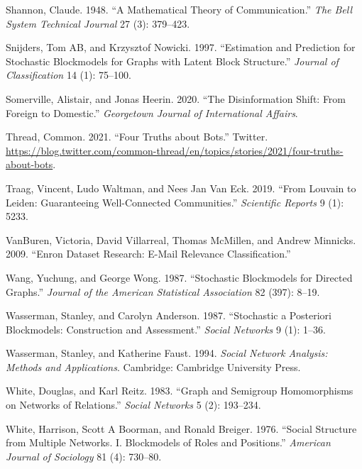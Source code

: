 \documentclass[
  12pt,
  a4paper,
  DIV=11,
  numbers=noendperiod,
  twoside,
  open=any]{scrartcl}
\newlength{\cslhangindent}
\newenvironment{CSLReferences}[2] %
 {\begin{list}{}{%
  \setlength{\itemindent}{0pt}
  \setlength{\leftmargin}{0pt}
  \setlength{\parsep}{0pt}
  \ifodd #1
   \setlength{\leftmargin}{\cslhangindent}
   \setlength{\itemindent}{-1\cslhangindent}
  \fi
  \setlength{\itemsep}{#2\baselineskip}}}
 {\end{list}}
\begin{document}
\begin{CSLReferences}{1}{0}
Shannon, Claude. 1948. {``A Mathematical Theory of Communication.''}
\emph{The Bell System Technical Journal} 27 (3): 379--423.

Snijders, Tom AB, and Krzysztof Nowicki. 1997. {``Estimation and
Prediction for Stochastic Blockmodels for Graphs with Latent Block
Structure.''} \emph{Journal of Classification} 14 (1): 75--100.

Somerville, Alistair, and Jonas Heerin. 2020. {``The Disinformation
Shift: From Foreign to Domestic.''} \emph{Georgetown Journal of
International Affairs}.

Thread, Common. 2021. {``Four Truths about Bots.''} Twitter.
\url{https://blog.twitter.com/common-thread/en/topics/stories/2021/four-truths-about-bots}.

Traag, Vincent, Ludo Waltman, and Nees Jan Van Eck. 2019. {``From
Louvain to Leiden: Guaranteeing Well-Connected Communities.''}
\emph{Scientific Reports} 9 (1): 5233.

VanBuren, Victoria, David Villarreal, Thomas McMillen, and Andrew
Minnicks. 2009. {``Enron Dataset Research: E-Mail Relevance
Classification.''}

Wang, Yuchung, and George Wong. 1987. {``Stochastic Blockmodels for
Directed Graphs.''} \emph{Journal of the American Statistical
Association} 82 (397): 8--19.

Wasserman, Stanley, and Carolyn Anderson. 1987. {``Stochastic a
Posteriori Blockmodels: Construction and Assessment.''} \emph{Social
Networks} 9 (1): 1--36.

Wasserman, Stanley, and Katherine Faust. 1994. \emph{Social Network
Analysis: Methods and Applications}. Cambridge: Cambridge University
Press.

White, Douglas, and Karl Reitz. 1983. {``Graph and Semigroup
Homomorphisms on Networks of Relations.''} \emph{Social Networks} 5 (2):
193--234.

White, Harrison, Scott A Boorman, and Ronald Breiger. 1976. {``Social
Structure from Multiple Networks. I. Blockmodels of Roles and
Positions.''} \emph{American Journal of Sociology} 81 (4): 730--80.


\end{CSLReferences}
\end{document}

